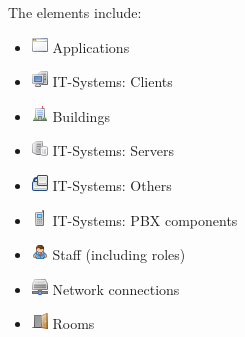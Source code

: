 \documentclass[a4paper,10pt]{book}
\begin{document}
\newline
The elements include:
\begin{itemize}
 \item \includegraphics[height=2ex]{Icon/Anwendung.png} Applications
 \item \includegraphics[height=2ex]{Icon/Clients.png} IT-Systems: Clients
 \item \includegraphics[height=2ex]{Icon/Gebaeude.png} Buildings
 \item \includegraphics[height=2ex]{Icon/Server.png} IT-Systems: Servers
 \item \includegraphics[height=2ex]{Icon/Sonstige.png} IT-Systems: Others
 \item \includegraphics[height=2ex]{Icon/Tk_komponenten.png} IT-Systems: PBX components
 \item \includegraphics[height=2ex]{Icon/Mitarbeiter.png} Staff (including roles)
 \item \includegraphics[height=2ex]{Icon/Netzwerkverbindungen.png} Network connections
 \item \includegraphics[height=2ex]{Icon/Raeume.png} Rooms
\end{itemize}
\end{document}
